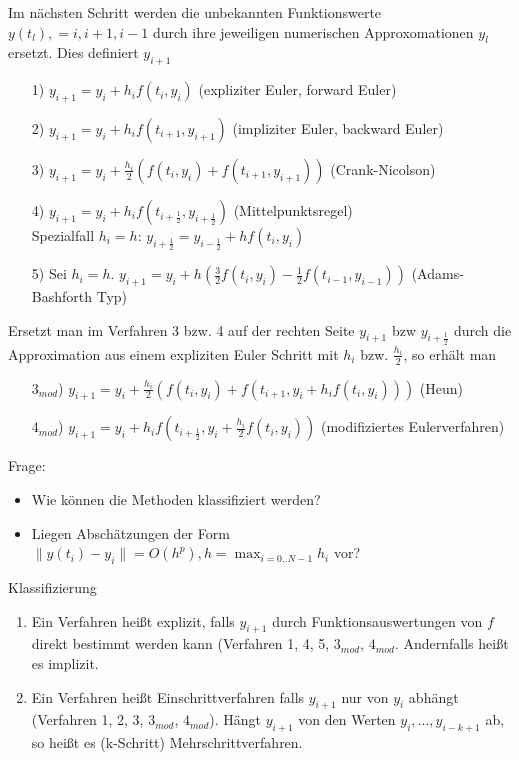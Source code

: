Im nächsten Schritt werden die unbekannten Funktionswerte $y(t_l),  = i, i+1, i-1$ durch ihre jeweiligen numerischen Approxomationen $y_l$ ersetzt. Dies definiert $y_{i+1}$

\begin{enumerate}
	\item[1)] $y_{i+1} = y_i + h_i f(t_i, y_i)$ (expliziter Euler, forward Euler)
	\item[2)] $y_{i+1} = y_i + h_i f(t_{i+1}, y_{i+1})$ (impliziter Euler, backward Euler)
	\item[3)] $y_{i+1} = y_i + \frac{h_i}{2} (f(t_i, y_i) + f(t_{i+1}, y_{i+1}))$ (Crank-Nicolson)
	\item[4)] $y_{i+1} = y_i + h_i f(t_{i+\frac{1}{2}}, y_{i+\frac{1}{2}})$ (Mittelpunktsregel) \\
		Spezialfall $h_i = h$: $y_{i+\frac{1}{2}} = y_{i-\frac{1}{2}} + h f(t_i, y_i)$
	\item[5)] Sei $h_i = h$. $y_{i+1} = y_i + h (\frac{3}{2} f(t_i, y_i) - \frac{1}{2} f(t_{i-1}, y_{i-1}))$ (Adams-Bashforth Typ)
\end{enumerate}

Ersetzt man im Verfahren 3 bzw. 4 auf der rechten Seite $y_{i+1}$ bzw $y_{i+\frac{1}{2}}$ durch die Approximation aus einem expliziten Euler Schritt mit $h_i$ bzw. $\frac{h_i}{2}$, so erhält man

\begin{enumerate}
	\item[$3_{mod}$)] $y_{i+1} = y_i + \frac{h_i}{2} (f(t_i, y_i) + f(t_{i+1}, y_i + h_i f(t_i, y_i)))$ (Heun)
	\item[$4_{mod}$)] $y_{i+1} = y_i + h_i f(t_{i+\frac{1}{2}}, y_i + \frac{h_i}{2} f(t_i, y_i))$ (modifiziertes Eulerverfahren)
\end{enumerate}

Frage: 
\begin{itemize}
	\item Wie können die Methoden klassifiziert werden?
	\item Liegen Abschätzungen der Form $\|y(t_i) - y_i\| = O(h^p), h = \!\displaystyle\max_{i=0..N-1}{h_i}$ vor?
\end{itemize} 

\begin{definition}[Definition IV.2]
	Klassifizierung
	\begin{enumerate}
		\item Ein Verfahren heißt explizit, falls $y_{i+1}$ durch Funktionsauswertungen von $f$ direkt bestimmt werden kann (Verfahren 1, 4, 5, $3_{mod}$, $4_{mod}$. Andernfalls heißt es implizit.
		\item Ein Verfahren heißt Einschrittverfahren falls $y_{i+1}$ nur von $y_i$ abhängt (Verfahren 1, 2, 3, $3_{mod}$, $4_{mod}$). Hängt $y_{i+1}$ von den Werten $y_i, ..., y_{i-k+1}$ ab, so heißt es (k-Schritt) Mehrschrittverfahren.  
	\end{enumerate}
\end{definition}

